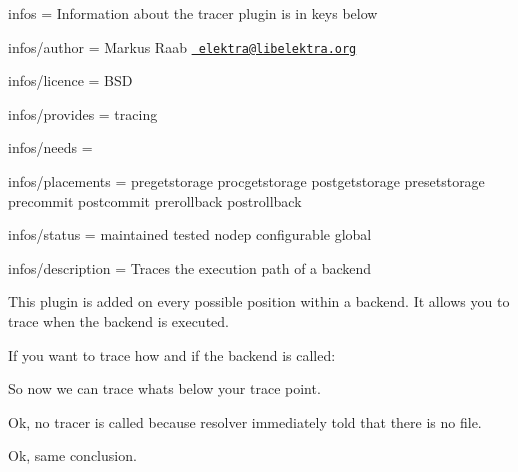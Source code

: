 
\begin{DoxyItemize}
\item infos = Information about the tracer plugin is in keys below
\item infos/author = Markus Raab \href{mailto:elektra@libelektra.org}{\texttt{ elektra@libelektra.\+org}}
\item infos/licence = B\+SD
\item infos/provides = tracing
\item infos/needs =
\item infos/placements = pregetstorage procgetstorage postgetstorage presetstorage precommit postcommit prerollback postrollback
\item infos/status = maintained tested nodep configurable global
\item infos/description = Traces the execution path of a backend
\end{DoxyItemize}

This plugin is added on every possible position within a backend. It allows you to trace when the backend is executed.

If you want to trace how and if the backend is called\+:


\begin{DoxyCode}{0}
\end{DoxyCode}


So now we can trace whats below your trace point.


\begin{DoxyCode}{0}
\end{DoxyCode}


Ok, no tracer is called because resolver immediately told that there is no file.


\begin{DoxyCode}{0}
\end{DoxyCode}


Ok, same conclusion.


\begin{DoxyCode}{0}
\end{DoxyCode}



